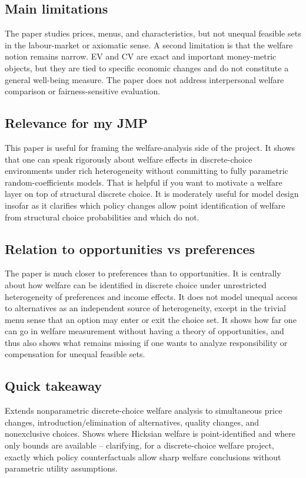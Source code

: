 \documentclass[11pt,a4paper]{article}
\begin{document}
\subsection*{Main limitations}
The paper studies prices, menus, and characteristics, but not unequal feasible sets in the labour-market or axiomatic sense. A second limitation is that the welfare notion remains narrow. EV and CV are exact and important money-metric objects, but they are tied to specific economic changes and do not constitute a general well-being measure. The paper does not address interpersonal welfare comparison or fairness-sensitive evaluation.

\subsection*{Relevance for my JMP}
This paper is useful for framing the welfare-analysis side of the project. It shows that one can speak rigorously about welfare effects in discrete-choice environments under rich heterogeneity without committing to fully parametric random-coefficients models. That is helpful if you want to motivate a welfare layer on top of structural discrete choice. It is moderately useful for model design insofar as it clarifies which policy changes allow point identification of welfare from structural choice probabilities and which do not.

\subsection*{Relation to opportunities vs preferences}
The paper is much closer to preferences than to opportunities. It is centrally about how welfare can be identified in discrete choice under unrestricted heterogeneity of preferences and income effects. It does not model unequal access to alternatives as an independent source of heterogeneity, except in the trivial menu sense that an option may enter or exit the choice set. It shows how far one can go in welfare measurement without having a theory of opportunities, and thus also shows what remains missing if one wants to analyze responsibility or compensation for unequal feasible sets.

\subsection*{Quick takeaway}
Extends nonparametric discrete-choice welfare analysis to simultaneous price changes, introduction/elimination of alternatives, quality changes, and nonexclusive choices. Shows where Hicksian welfare is point-identified and where only bounds are available -- clarifying, for a discrete-choice welfare project, exactly which policy counterfactuals allow sharp welfare conclusions without parametric utility assumptions.
\end{document}
